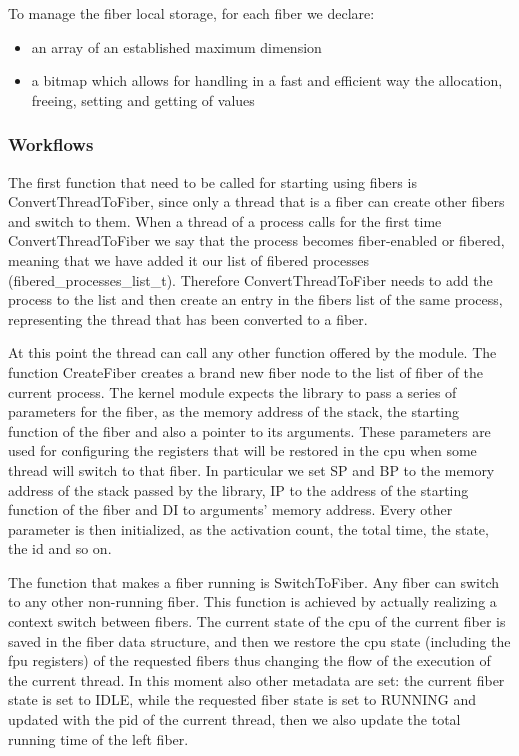 \documentclass[a4paper,10pt]{article}
\begin{document}
To manage the fiber local storage, for each fiber we declare:
\begin{itemize}
	\item an array of an established maximum dimension
	\item a bitmap which allows for handling in a fast and efficient way the allocation, freeing, setting and getting of values
\end{itemize}

\subsubsection{Workflows}
The first function that need to be called for starting using fibers is ConvertThreadToFiber, since only a thread that is a fiber can create other fibers and switch to them. When a thread of a process calls for the first time ConvertThreadToFiber we say that the process becomes fiber-enabled or fibered, meaning that we have added it our list of fibered processes (fibered\_processes\_list\_t). Therefore ConvertThreadToFiber needs to add the process to the list and then create an entry in the fibers list of the same process, representing the thread that has been converted to a fiber.

At this point the thread can call any other function offered by the module. The function CreateFiber creates a brand new fiber node to the list of fiber of the current process. The kernel module expects the library to pass a series of parameters for the fiber, as the memory address of the stack, the starting function of the fiber and also a pointer to its arguments. These parameters are used for configuring the registers that will be restored in the cpu when some thread will switch to that fiber. In particular we set SP and BP to the memory address of the stack passed by the library, IP to the address of the starting function of the fiber and DI to arguments’ memory address. Every other parameter is then initialized, as the activation count, the total time, the state, the id and so on.

The function that makes a fiber running is SwitchToFiber. Any fiber can switch to any other non-running fiber. This function is achieved by actually realizing a context switch between fibers. The current state of the cpu of the current fiber is saved in the fiber data structure, and then we restore the cpu state (including the fpu registers) of the requested fibers thus changing the flow of the execution of the current thread. In this moment also other metadata are set: the current fiber state is set to IDLE, while the requested fiber state is set to RUNNING and updated with the pid of the current thread, then we also update the total running time of the left fiber.
\end{document}
